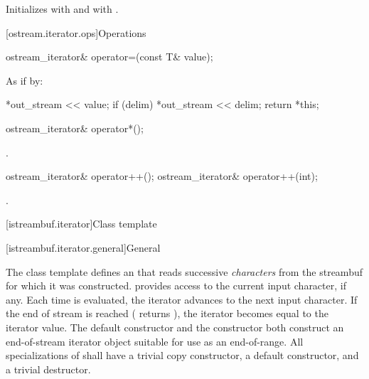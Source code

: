 \begin{itemdescr}
\pnum
\effects
Initializes  with  and
 with .
\end{itemdescr}

[ostream.iterator.ops]{Operations}

%
\begin{itemdecl}
ostream_iterator& operator=(const T& value);
\end{itemdecl}

\begin{itemdescr}
\pnum
\effects
As if by:
\begin{codeblock}
*out_stream << value;
if (delim)
  *out_stream << delim;
return *this;
\end{codeblock}
\end{itemdescr}

%
\begin{itemdecl}
ostream_iterator& operator*();
\end{itemdecl}

\begin{itemdescr}
\pnum
\returns
{}.
\end{itemdescr}

%
\begin{itemdecl}
ostream_iterator& operator++();
ostream_iterator& operator++(int);
\end{itemdecl}

\begin{itemdescr}
\pnum
\returns
{}.
\end{itemdescr}

[istreambuf.iterator]{Class template }

[istreambuf.iterator.general]{General}

\pnum
The
class template
defines an  that
reads successive
\textit{characters}
from the streambuf for which it was constructed.
provides access to the current input character, if any.
Each time
is evaluated, the iterator advances to the next input character.
If the end of stream is reached ( returns
),
the iterator becomes equal to the
iterator value.
The default constructor
and the constructor
both construct an end-of-stream iterator object suitable for use
as an end-of-range.
All specializations of  shall have a trivial copy
constructor, a  default constructor, and a trivial destructor.

